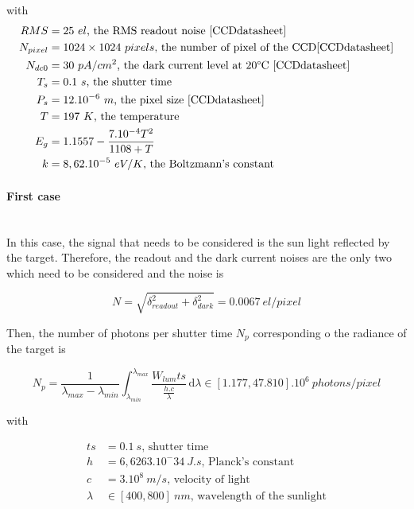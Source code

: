with
\begin{align*}
RMS & = 25\ el\mbox{, the RMS readout noise \ref{CCDdatasheet}}\\
N_{pixel} & = 1024\times 1024 \ pixels\mbox{, the number of pixel of the CCD\ref{CCDdatasheet}}\\
N_{dc0} & = 30\ pA/cm^2\mbox{, the dark current level at 20\textdegree C \ref{CCDdatasheet}}\\
T_s & = 0.1\ s\mbox{, the shutter time}\\
P_s & = 12.10^{-6}\ m\mbox{, the  pixel size \ref{CCDdatasheet}}\\
T & = 197\ K\mbox{, the temperature}\\
E_g & = 1.1557-\frac{7.10^{-4}T^2}{1108+T}\\
k & = 8,62.10^{-5}\ eV/K\mbox{, the Boltzmann's constant}
\end{align*}


\paragraph*{First case}
\label{first case}
~~\\
In this case, the signal that needs to be considered is the sun light reflected by the target. Therefore, the readout and the dark current noises are the only two which need to be considered and the noise is

\begin{equation}
\label{eq:Noise case1}
N = \sqrt{\delta_{readout}^2+\delta_{dark}^2} = 0.0067\ el/pixel
\end{equation}

Then, the number of photons per shutter time $N_p$ corresponding o the radiance of the target is

\begin{equation}
\label{eq:Number Photons per Shutter Time case1}
N_p = \frac{1}{\lambda_{max}-\lambda_{min}}\int_{\lambda_{min}}^{\lambda_{max}} \frac{W_{lum}ts}{\frac{h.c}{\lambda}} \, \mathrm d\lambda \in [1.177, 47.810].10^{6} \ photons/pixel
\end{equation}

with

\begin{align*}
ts & = 0.1\ s \mbox{, shutter time}  \\
h & = 6,6263.10^-34 \ J.s \mbox{, Planck's constant}  \\
c & = 3.10^8 \ m/s \mbox{, velocity of light} \\
\lambda & \in [400, 800] \ nm \mbox{, wavelength of the sunlight}
\end{align*}

